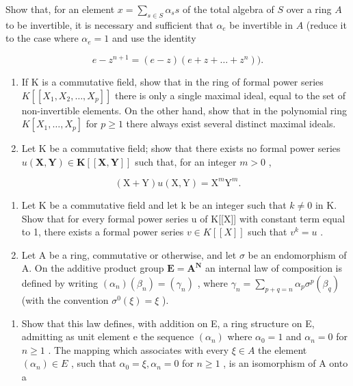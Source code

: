Show that, for an element \(x = \sum_{s \in S} \alpha_s s\) of the total algebra of \(S\) over a ring \(A\) to be invertible, it is necessary and sufficient that \(\alpha_e\) be invertible in \(A\) (reduce it to the case where \(\alpha_e = 1\) and use the identity

\[
e - z ^ {n + 1} = (e - z) (e + z + \dots + z ^ {n})).
\]

\begin{enumerate}
\def\labelenumi{\arabic{enumi}.}
\setcounter{enumi}{21}
\item
  If K is a commutative field, show that in the ring of formal power series \(K[[X_{1}, X_{2}, \ldots, X_{p}]]\) there is only a single maximal ideal, equal to the set of non-invertible elements. On the other hand, show that in the polynomial ring \(K[X_{1}, \ldots, X_{p}]\) for \(p \geqslant 1\) there always exist several distinct maximal ideals.
\item
  Let K be a commutative field; show that there exists no formal power series \(u(\mathbf{X}, \mathbf{Y}) \in \mathbf{K}[[\mathbf{X}, \mathbf{Y}]]\) such that, for an integer \(m > 0\) ,
\end{enumerate}

\[
(\mathrm{X} + \mathrm{Y}) u (\mathrm{X}, \mathrm{Y}) = \mathrm{X} ^ {m} \mathrm{Y} ^ {m}.
\]

\begin{enumerate}
\def\labelenumi{\arabic{enumi}.}
\setcounter{enumi}{23}
\item
  Let K be a commutative field and let k be an integer such that \(k \neq 0\) in K. Show that for every formal power series u of K{[}{[}X{]}{]} with constant term equal to 1, there exists a formal power series \(v \in K[[X]]\) such that \(v^{k} = u\) .
\item
  Let A be a ring, commutative or otherwise, and let \(\sigma\) be an endomorphism of A. On the additive product group \(\mathbf{E} = \mathbf{A}^{\mathbf{N}}\) an internal law of composition is defined by writing \((\alpha_{n})(\beta_{n}) = (\gamma_{n})\) , where \(\gamma_{n} = \sum_{p + q = n}\alpha_{p}\sigma^{p}(\beta_{q})\) (with the convention \(\sigma^0 (\xi) = \xi\) ).
\end{enumerate}

\begin{enumerate}
\def\labelenumi{(\alph{enumi})}
\tightlist
\item
  Show that this law defines, with addition on E, a ring structure on E, admitting as unit element e the sequence \((\alpha_{n})\) where \(\alpha_{0}=1\) and \(\alpha_{n}=0\) for \(n\geqslant1\) . The mapping which associates with every \(\xi\in A\) the element \((\alpha_{n})\in E\) , such that \(\alpha_{0}=\xi,\alpha_{n}=0\) for \(n\geqslant1\) , is an isomorphism of A onto a
\end{enumerate}


